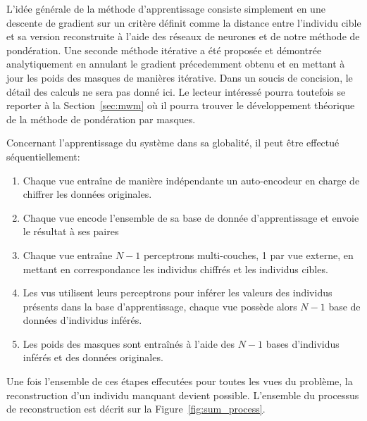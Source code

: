     L'idée générale de la méthode d'apprentissage consiste simplement en une descente de gradient sur un critère définit comme la distance entre l'individu cible et sa version reconstruite à l'aide des réseaux de neurones et de notre méthode de pondération. Une seconde méthode itérative a été proposée et démontrée analytiquement en annulant le gradient précedemment obtenu et en mettant à jour les poids des masques de manières itérative. Dans un soucis de concision, le détail des calculs ne sera pas donné ici. Le lecteur intéressé pourra toutefois se reporter à la Section~\ref{sec:mwm} où il pourra trouver le développement théorique de la méthode de pondération par masques.

    Concernant l'apprentissage du système dans sa globalité, il peut \^{e}tre effectué séquentiellement:
    \begin{enumerate}
        \item Chaque vue entraîne de manière indépendante un auto-encodeur en charge de chiffrer les données originales.
        \item Chaque vue encode l'ensemble de sa base de donnée d'apprentissage et envoie le résultat à ses paires
        \item Chaque vue entraîne $N-1$ perceptrons multi-couches, 1 par vue externe, en mettant en correspondance les individus chiffrés et les individus cibles.
        \item Les vus utilisent leurs perceptrons pour inférer les valeurs des individus présents dans la base d'apprentissage, chaque vue possède alors $N-1$ base de données d'individus inférés.
        \item Les poids des masques sont entraînés à l'aide des $N-1$ bases d'individus inférés et des données originales.
    \end{enumerate}

    Une fois l'ensemble de ces étapes effecutées pour toutes les vues du problème, la reconstruction d'un individu manquant devient possible. L'ensemble du processus de reconstruction est décrit sur la Figure~\ref{fig:sum_process}.

